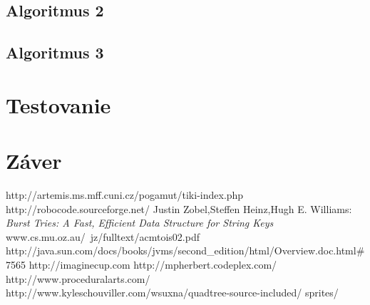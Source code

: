 \documentclass[12pt,a4paper,notitlepage]{report}
\begin{document}
\section{Algoritmus 2}
\section{Algoritmus 3}
\chapter{Testovanie}

\chapter{Záver}
\newpage
{}
\begin{thebibliography}{99}
http://artemis.ms.mff.cuni.cz/pogamut/tiki-index.php
 http://robocode.sourceforge.net/
Justin Zobel,Steffen Heinz,Hugh E. Williams:\\
{\it Burst Tries: A Fast, Efficient Data Structure for String Keys} www.cs.mu.oz.au/~jz/fulltext/acmtois02.pdf
http://java.sun.com/docs/books/jvms/second\_edition/html/Overview.doc.html\#7565
http://imaginecup.com
http://mpherbert.codeplex.com/
http://www.proceduralarts.com/
http://www.kyleschouviller.com/wsuxna/quadtree-source-included/
 sprites/
\end{thebibliography}
\end{document}
